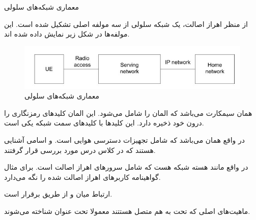 \Problem
{معماری شبکه‌های سلولی}
{
از منظر اهراز اصالت، یک شبکه سلولی از سه مولفه اصلی تشکیل شده است.
این مولفه‌ها در شکل زیر نمایش داده شده اند.

\begin{figure}[H]
    \includegraphics[width=15cm]{Images/IMG_02.jpg}
    \centering
    \caption{معماری شبکه‌های سلولی}
\end{figure}

همان سیمکارت می‌باشد که المان
را شامل می‌شود.
این المان کلیدهای رمزنگاری را درون خود ذخیره دارد. این کلیدها با کلیدهای سمت شبکه یکی است.

در واقع همان
می‌باشد که شامل تجهیزات دسترسی هوایی است.
 و 
اسامی آشنایی هستند که در کلاس درس مورد بررسی قرار گرفتند.

در واقع مانند هسته شبکه هست که شامل سرورهای اهراز اصالت است.
برای مثال
گواهینامه کاربرهای اهراز اصالت شده را نگه می‌دارد.

ارتباط میان
 و 
از طریق
برقرار است.

ماهیت‌های اصلی که تحت
به هم متصل هستتند معمولا تحت عنوان
شناخته می‌شوند.
}
